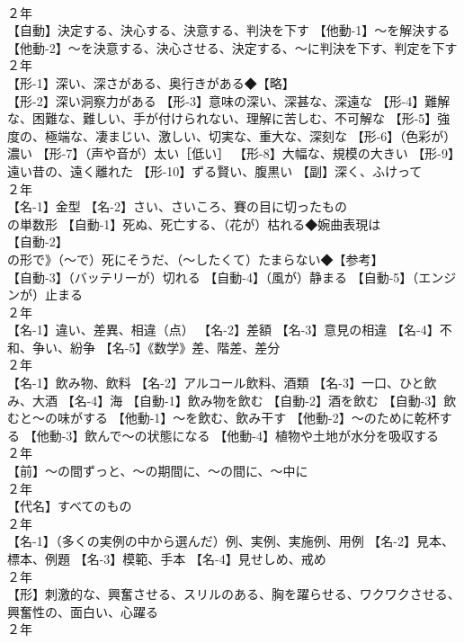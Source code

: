 \documentclass[8pt]{extreport}
\begin{document}
\begin{CJK}{UTF8}{min}
\\	２年	
\\	【自動】決定する、決心する、決意する、判決を下す 【他動-1】～を解決する 【他動-2】～を決意する、決心させる、決定する、～に判決を下す、判定を下す
\\	２年	
\\	【形-1】深い、深さがある、奥行きがある◆【略】
\\	【形-2】深い洞察力がある 【形-3】意味の深い、深甚な、深遠な 【形-4】難解な、困難な、難しい、手が付けられない、理解に苦しむ、不可解な 【形-5】強度の、極端な、凄まじい、激しい、切実な、重大な、深刻な 【形-6】（色彩が）濃い 【形-7】（声や音が）太い［低い］ 【形-8】大幅な、規模の大きい 【形-9】遠い昔の、遠く離れた 【形-10】ずる賢い、腹黒い 【副】深く、ふけって
\\	２年	
\\	【名-1】金型 【名-2】さい、さいころ、賽の目に切ったもの
\\	の単数形 【自動-1】死ぬ、死亡する、（花が）枯れる◆婉曲表現は 
\\	【自動-2】
\\	の形で》（～で）死にそうだ、（～したくて）たまらない◆【参考】
\\	【自動-3】（バッテリーが）切れる 【自動-4】（風が）静まる 【自動-5】（エンジンが）止まる
\\	２年	
\\	【名-1】違い、差異、相違（点） 【名-2】差額 【名-3】意見の相違 【名-4】不和、争い、紛争 【名-5】《数学》差、階差、差分
\\	２年	
\\	【名-1】飲み物、飲料 【名-2】アルコール飲料、酒類 【名-3】一口、ひと飲み、大酒 【名-4】海 【自動-1】飲み物を飲む 【自動-2】酒を飲む 【自動-3】飲むと～の味がする 【他動-1】～を飲む、飲み干す 【他動-2】～のために乾杯する 【他動-3】飲んで～の状態になる 【他動-4】植物や土地が水分を吸収する
\\	２年	
\\	【前】～の間ずっと、～の期間に、～の間に、～中に
\\	２年	
\\	【代名】すべてのもの
\\	２年	
\\	【名-1】（多くの実例の中から選んだ）例、実例、実施例、用例 【名-2】見本、標本、例題 【名-3】模範、手本 【名-4】見せしめ、戒め
\\	２年	
\\	【形】刺激的な、興奮させる、スリルのある、胸を躍らせる、ワクワクさせる、興奮性の、面白い、心躍る
\\	２年	

\end{CJK}
\end{document}
